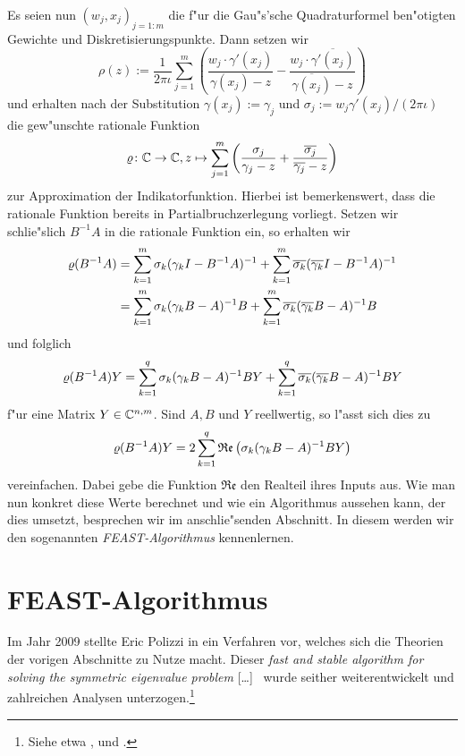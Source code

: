 \newpage

Es seien nun $(w_j, x_j)_{j=1:m}$
die f"ur die Gau"s'sche Quadraturformel ben"otigten Gewichte und Diskretisierungspunkte.
Dann setzen wir
\[
\rho(z) := \frac{1}{2\pi\iota}\sum_{j=1}^m \left(
\frac{w_j \cdot \gamma'(x_j)}{\gamma(x_j)-z} - \frac{w_j \cdot \overline{\gamma'(x_j)}}{\overline{\gamma(x_j)}-z}
\right)
\]
und erhalten nach der Substitution $\gamma(x_j) := \gamma_j$ und
$\sigma_j := w_j \gamma'(x_j) / (2\pi\iota)$ die gew"unschte rationale
Funktion
\[
\varrho\colon\mathbb{C}\to\mathbb{C}, z\mapsto\sum_{j=1}^m\left(\frac{\sigma_j}{\gamma_j - z} +
\frac{\overline{\sigma_j}}{\overline{\gamma_j} - z}\right)
\]
zur Approximation der Indikatorfunktion. Hierbei ist bemerkenswert, dass die
rationale Funktion bereits in Partialbruchzerlegung vorliegt.
Setzen wir schlie"slich $B^{-1}A$ in die
rationale Funktion ein, so erhalten wir
\begin{align*}
\varrho(B^{-1}A) &= \sum_{k=1}^m \sigma_k (\gamma_k I - B^{-1}A)^{-1} +
\sum_{k=1}^m \overline{\sigma_k} (\overline{\gamma_k} I - B^{-1}A)^{-1}\\
&= \sum_{k=1}^m \sigma_k (\gamma_k B - A)^{-1} B +
\sum_{k=1}^m \overline{\sigma_k} (\overline{\gamma_k} B - A)^{-1} B
\end{align*}
und folglich
\[
\varrho(B^{-1}A)Y =
\sum_{k=1}^q \sigma_k (\gamma_k B - A)^{-1} BY +
\sum_{k=1}^q \overline{\sigma_k} (\overline{\gamma_k} B - A)^{-1} BY
\]
f"ur eine Matrix $Y\in\mathbb{C}^{n,m}$. Sind $A, B$ und $Y$ reellwertig, so l"asst sich dies zu
\begin{equation}\label{eq:chap4:realteilsumme}
\varrho(B^{-1}A)Y =
2\sum_{k=1}^q \mathfrak{Re}\left(\sigma_k (\gamma_k B - A)^{-1} BY\right)
\end{equation}
vereinfachen. Dabei gebe die Funktion $\mathfrak{Re}$ den Realteil ihres Inputs aus. Wie man nun konkret diese Werte berechnet und wie ein Algorithmus aussehen kann, der dies umsetzt, besprechen wir im anschlie"senden Abschnitt. In diesem werden wir den sogenannten \emph{FEAST-Algorithmus} kennenlernen.

\newpage

\section{FEAST-Algorithmus}

Im Jahr 2009 stellte Eric Polizzi in \cite{polizzi} ein Verfahren vor, welches sich die Theorien der vorigen Abschnitte zu Nutze macht. Dieser \glqq[\ldots] \emph{fast and stable algorithm for solving the symmetric eigenvalue problem} [\ldots]\grqq\ \cite[Abstract]{polizzi} wurde seither weiterentwickelt und zahlreichen Analysen unterzogen.\footnote{Siehe etwa \cite{lzp},\cite{kpt} und \cite{ptep}.}\\


